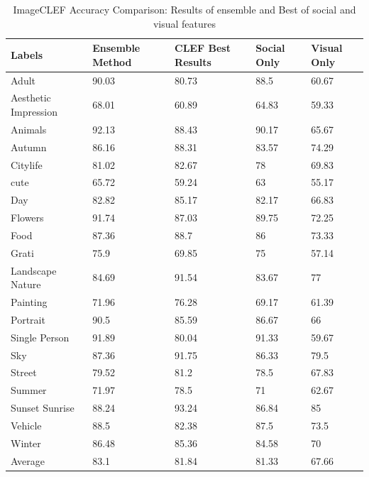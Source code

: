 \begin{table}
\centering
\caption{ ImageCLEF Accuracy Comparison:  Results of ensemble and Best of social and visual features} %
\vspace*{0.2 cm}
\begin{tabular}{| p{1.7cm}| p{1.5cm}|p{1.2cm}|p{1.2cm}|p{1.2cm}|} \hline
Labels & Ensemble Method & CLEF Best Results & Social Only & Visual Only  \\  [1ex] \hline
Adult & 90.03 & 80.73 & 88.5 & 60.67 \\ [1ex] \hline
Aesthetic Impression & 68.01 & 60.89 & 64.83 & 59.33 \\ [1ex] \hline
Animals & 92.13 & 88.43 & 90.17 & 65.67 \\ [1ex] \hline
Autumn & 86.16 & 88.31 & 83.57 & 74.29 \\ [1ex] \hline
Citylife & 81.02 & 82.67 & 78 & 69.83 \\ [1ex] \hline
cute & 65.72 & 59.24 & 63 & 55.17 \\ [1ex] \hline
Day & 82.82 & 85.17 & 82.17 & 66.83 \\ [1ex] \hline
Flowers & 91.74 & 87.03 & 89.75 & 72.25 \\ [1ex] \hline
Food & 87.36 & 88.7 & 86 & 73.33 \\ [1ex] \hline
Grati & 75.9 & 69.85 & 75 & 57.14 \\ [1ex] \hline
Landscape Nature & 84.69 & 91.54 & 83.67 & 77 \\ [1ex] \hline
Painting & 71.96 & 76.28 & 69.17 & 61.39 \\ [1ex] \hline
Portrait & 90.5 & 85.59 & 86.67 & 66 \\ [1ex] \hline
Single Person & 91.89 & 80.04 & 91.33 & 59.67 \\ [1ex] \hline
Sky & 87.36 & 91.75 & 86.33 & 79.5 \\ [1ex] \hline
Street & 79.52 & 81.2 & 78.5 & 67.83 \\ [1ex] \hline
Summer & 71.97 & 78.5 & 71 & 62.67 \\ [1ex] \hline
Sunset Sunrise & 88.24 & 93.24 & 86.84 & 85 \\ [1ex] \hline
Vehicle & 88.5 & 82.38 & 87.5 & 73.5 \\ [1ex] \hline
Winter & 86.48 & 85.36 & 84.58 & 70 \\ [1ex] \hline
Average & 83.1 & 81.84 & 81.33 & 67.66 \\ [1ex] \hline
\end{tabular}
 \label{ImageCLEFAccuracyOverAll} %
\end{table}




